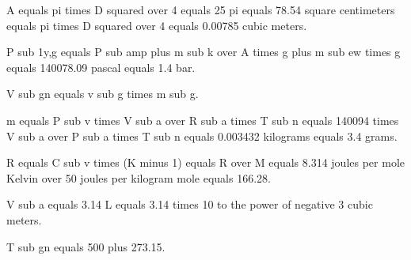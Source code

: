 A equals pi times D squared over 4 equals 25 pi equals 78.54 square centimeters equals pi times D squared over 4 equals 0.00785 cubic meters.

P sub 1y,g equals P sub amp plus m sub k over A times g plus m sub ew times g equals 140078.09 pascal equals 1.4 bar.

V sub gn equals v sub g times m sub g.

m equals P sub v times V sub a over R sub a times T sub n equals 140094 times V sub a over P sub a times T sub n equals 0.003432 kilograms equals 3.4 grams.

R equals C sub v times (K minus 1) equals R over M equals 8.314 joules per mole Kelvin over 50 joules per kilogram mole equals 166.28.

V sub a equals 3.14 L equals 3.14 times 10 to the power of negative 3 cubic meters.

T sub gn equals 500 plus 273.15.